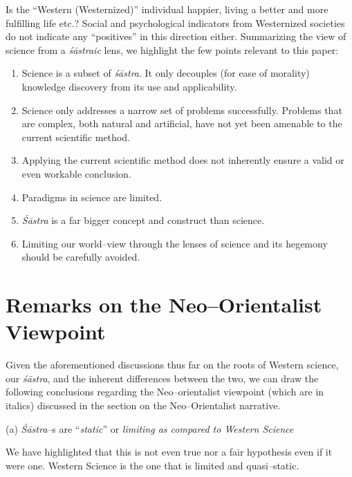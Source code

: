 Is the “Western (Westernized)” individual happier, living a better and more fulfilling life etc.? Social and psychological indicators from Westernized societies do not indicate any “positives” in this direction either. Summarizing the view of science from a \textit{śāstraic} lens, we highlight the few points relevant to this paper:

\begin{enumerate}
\item Science is a subset of \textit{śāstra}. It only decouples (for ease of morality) knowledge discovery from its use and applicability.

 \item Science only addresses a narrow set of problems successfully. Problems that are complex, both natural and artificial, have not yet been amenable to the current scientific method.

 \item Applying the current scientific method does not inherently ensure a valid or even workable conclusion.

 \item Paradigms in science are limited.

 \item \textit{Śāstra} is a far bigger concept and construct than science.

 \item Limiting our world–view through the lenses of science and its hegemony should be carefully avoided.

\end{enumerate}


\section*{Remarks on the Neo–Orientalist Viewpoint}

Given the aforementioned discussions thus far on the roots of Western science, our \textit{śāstra}, and the inherent differences between the two, we can draw the following conclusions regarding the Neo–orientalist viewpoint (which are in italics) discussed in the section on the Neo–Orientalist narrative.

(a) \textit{Śāstra}–s are “\textit{static}” or \textit{limiting as compared to Western Science}

We have highlighted that this is not even true nor a fair hypothesis even if it were one. Western Science is the one that is limited and quasi–static.

